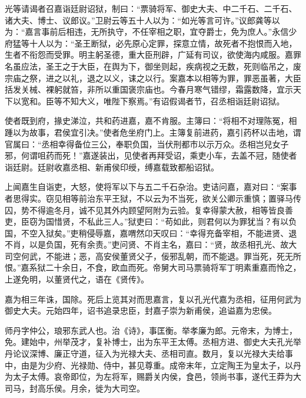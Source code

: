 \documentclass[12pt,UTF8]{ctexbook}
\begin{document}
光等请谒者召嘉诣廷尉诏狱，制曰：“票骑将军、御史大夫、中二千石、二千石、诸大夫、博士、议郎议。”卫尉云等五十人以为：“如光等言可许。”议郎龚等以为：“嘉言事前后相违，无所执守，不任宰相之职，宜夺爵士，免为庶人。”永信少府猛等十人以为：“圣王断狱，必先原心定罪，探意立情，故死者不抱恨而入地，生者不衔怨而受罪。明主躬圣德，重大臣刑辟，广延有司议，欲使海内咸服。嘉罪名虽应法，圣王之于大臣，在舆为下，御坐则起，疾病视之无数，死则临吊之，废宗庙之祭，进之以礼，退之以义，诔之以行。案嘉本以相等为罪，罪恶虽著，大臣括发关械、裸躬就笞，非所以重国褒宗庙也。今春月寒气错缪，霜露数降，宜示天下以宽和。臣等不知大义，唯陛下察焉。”有诏假谒者节，召丞相诣廷尉诏狱。



使者既到府，掾史涕泣，共和药进嘉，嘉不肯服。主簿曰：“将相不对理陈冤，相踵以为故事，君侯宜引决。”使者危坐府门上。主簿复前进药，嘉引药杯以击地，谓官属曰：“丞相幸得备位三公，奉职负国，当伏刑都市以示万众。丞相岂兒女子邪，何谓咀药而死！”嘉遂装出，见使者再拜受诏，乘吏小车，去盖不冠，随使者诣廷尉。廷尉收嘉丞相、新甫侯印绶，缚嘉载致都船诏狱。



上闻嘉生自诣吏，大怒，使将军以下与五二千石杂治。吏诘问嘉，嘉对曰：“案事者思得实。窃见相等前治东平王狱，不以云为不当死，欲关公卿示重慎；置驿马传囚，势不得逾冬月，诚不见其外内顾望阿附为云验。复幸得蒙大赦，相等皆良善吏，臣窃为国惜贤，不私此三人。”狱吏曰：“苟如此，则君何以为罪犹当？有以负国，不空入狱矣。”吏稍侵辱嘉，嘉喟然卬天叹曰：“幸得充备宰相，不能进贤、退不肖，以是负国，死有余责。”吏问贤、不肖主名，嘉曰：“贤，故丞相孔光、故大司空何武，不能进；恶，高安侯董贤父子，佞邪乱朝，而不能退。罪当死，死无所恨。”嘉系狱二十余日，不食，欧血而死。帝舅大司马票骑将军丁明素重嘉而怜之，上遂免明，以董贤代之，语在《贤传》。



嘉为相三年诛，国除。死后上览其对而思嘉言，复以孔光代嘉为丞相，征用何武为御史大夫。元始四年，诏书追录忠臣，封嘉子崇为新甫侯，追谥嘉为忠侯。



师丹字仲公，琅邪东武人也。治《诗》，事匡衡。举孝廉为郎。元帝末，为博士，免。建始中，州举茂才，复补博士，出为东平王太傅。丞相方进、御史大夫孔光举丹论议深博、廉正守道，征入为光禄大夫、丞相司直。数月，复以光禄大夫给事中，由是为少府、光禄勋、侍中，甚见尊重。成帝末年，立定陶王为皇太子，以丹为太子太傅。哀帝即位，为左将军，赐爵关内侯，食邑，领尚书事，遂代王莽为大司马，封高乐侯。月余，徙为大司空。
\end{document}
